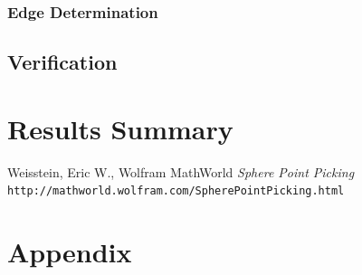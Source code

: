 \documentclass{article}
\begin{document}
        \subsubsection{Edge Determination}

    \subsection{Verification}


\section{Results Summary}

\newpage

\begin{thebibliography}{10}
    Weisstein, Eric W., Wolfram MathWorld
    \textit{Sphere Point Picking}
    \texttt{http://mathworld.wolfram.com/SpherePointPicking.html}

\end{thebibliography}

\newpage

\section{Appendix}
\end{document}
